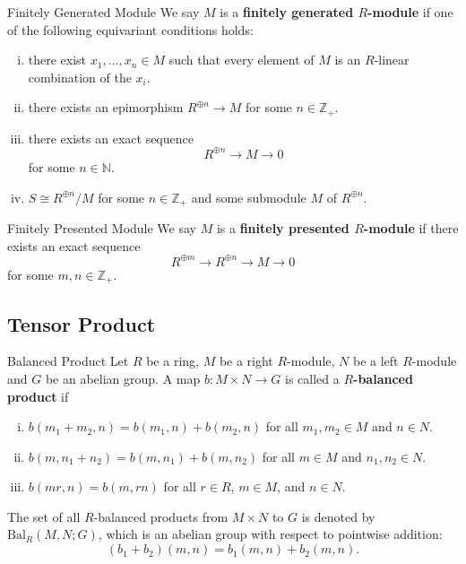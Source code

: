\begin{definition}{Finitely Generated Module}{}
    We say $M$ is a \textbf{finitely generated $R$-module} if 
    one of the following equivariant conditions holds:
    \begin{enumerate}[(i)]
        \item there exist $x_1, \ldots, x_n \in M$ such that every element of $M$ is an $R$-linear combination of the $x_i$. 
        \item there exists an epimorphism $R^{\oplus n} \rightarrow M$ for some $n \in \mathbb{Z}_+$.
        \item there exists an exact sequence
        \[
        R^{\oplus n}  \rightarrow M \rightarrow 0
        \]
        for some $n\in \mathbb{N}$.
        \item $S\cong R^{\oplus n}/M$ for some $n\in \mathbb{Z}_+$ and some submodule $M$ of $R^{\oplus n}$.
    \end{enumerate}
\end{definition}

\begin{definition}{Finitely Presented Module}{}
    We say $M$ is a \textbf{finitely presented $R$-module} if 
    there exists an exact sequence
    \[
    R^{\oplus m} \rightarrow R^{\oplus n} \rightarrow M \rightarrow 0
    \]
    for some $m, n\in \mathbb{Z}_+$.
\end{definition}

\subsection{Tensor Product}

\begin{definition}{Balanced Product}{}
    Let $R$ be a ring, $M$ be a right $R$-module, $N$ be a left $R$-module and $G$ be an abelian group. A map $b:M\times N\to G$ is called a \textbf{$R$-balanced product} if 
    \begin{enumerate}[(i)]
        \item $b(m_1+m_2, n)=b(m_1, n)+b(m_2, n)$ for all $m_1, m_2\in M$ and $n\in N$.
        \item $b(m, n_1+n_2)=b(m, n_1)+b(m, n_2)$ for all $m\in M$ and $n_1, n_2\in N$.
        \item $b(mr, n)=b(m, rn)$ for all $r\in R$, $m\in M$, and $n\in N$.
    \end{enumerate}
    The set of all $R$-balanced products from $M\times N$ to $G$ is denoted by $\mathrm{Bal}_R(M, N; G)$, which is an abelian group with respect to pointwise addition:
    \[
        (b_1+b_2)(m, n)=b_1(m, n)+b_2(m, n).
    \]
\end{definition}

